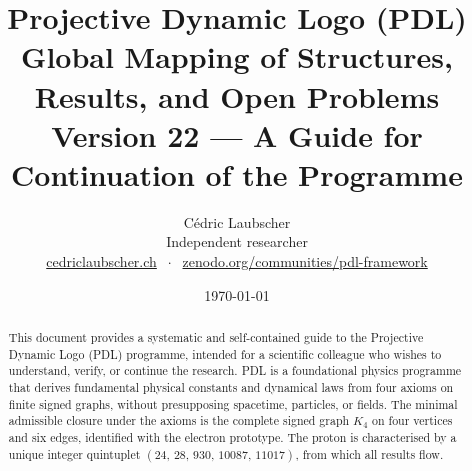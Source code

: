 \documentclass[11pt,a4paper]{article}
\title{Projective Dynamic Logo (PDL)\\[4pt]
\large Global Mapping of Structures, Results, and Open Problems\\[2pt]
\normalsize Version 22 --- A Guide for Continuation of the Programme}
\author{C\'edric Laubscher\\[4pt]
\small Independent researcher\\
\small \href{https://cedriclaubscher.ch}{cedriclaubscher.ch}
$\;\cdot\;$
\small \href{https://zenodo.org/communities/pdl-framework/}{zenodo.org/communities/pdl-framework}}
\date{\today}
\theoremstyle{plain}
\theoremstyle{definition}
\theoremstyle{remark}
\newcommand{\Kfour}{K_4}
\newcommand{\quintuplet}{(24,\,28,\,930,\,10087,\,11017)}
\begin{document}
\maketitle
\setcounter{tocdepth}{2}

\begin{abstract}
This document provides a systematic and self-contained guide to the Projective Dynamic Logo (PDL) programme, intended for a scientific colleague who wishes to understand, verify, or continue the research. PDL is a foundational physics programme that derives fundamental physical constants and dynamical laws from four axioms on finite signed graphs, without presupposing spacetime, particles, or fields. The minimal admissible closure under the axioms is the complete signed graph $\Kfour$ on four vertices and six edges, identified with the electron prototype. The proton is characterised by a unique integer quintuplet $\quintuplet$, from which all results flow.


\end{abstract}
\end{document}
